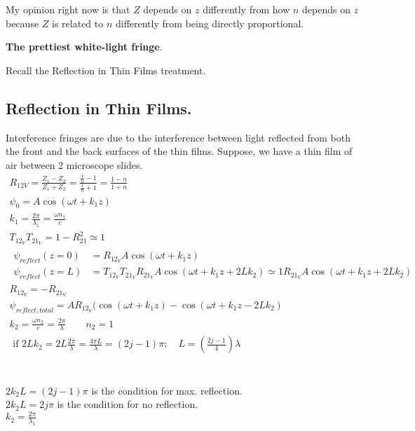 \documentclass[twoside,10pt]{amsart}
\newcommand{\problemhead}[1]
  {\smallskip
   \noindent{\large\bf Problem #1.}
   \smallskip}
\begin{document}
My opinion right now is that $Z$ depends on $z$ differently from how $n$ depends on $z$ because $Z$ is related to $n$ differently from being directly proportional.  

\problemhead{5.23} \textbf{ The prettiest white-light fringe}.  

Recall the Reflection in Thin Films treatment.  

\subsection*{ Reflection in Thin Films.}  

Interference fringes are due to the interference between light reflected from both the front and the back surfaces of the thin films.  Suppose, we have a thin film of air between 2 microscope slides.  
\[
\begin{gathered}
  R_{12V} = \frac{ Z_1 - Z_2}{ Z_1 + Z_2 } = \frac{ \frac{1}{n} - 1 }{ \frac{1}{n} + 1 } = \frac{ 1 - n }{ 1 + n } \\
  \psi_0 = A \cos{ (\omega t + k_1 z ) } \\
  k_1 = \frac{ 2 \pi }{ \lambda_1} = \frac{ \omega n_1 }{ c } \\
  T_{12_V} T_{21_V} = 1 - R_{21}^2 \simeq 1 \\
  \begin{aligned}
    \psi_{reflect}(z=0) & = R_{12_V} A \cos{ (\omega t + k_1 z) } \\ 
    \psi_{reflect}(z=L) & = T_{12_V} T_{21_V} R_{21_V} A \cos{ (\omega t + k_1 z + 2 Lk_2 ) } \simeq 1 R_{21_V} A \cos{( \omega t + k_1 z + 2 Lk_2 ) }
  \end{aligned} \\
  R_{12_V} = -R_{21_V} \\
  \psi_{reflect, total} = AR_{12_V} (\cos{ (\omega t + k_1 z )} - \cos{ (\omega t + k_1 z  - 2 Lk_2 ) } \\
  k_2 = \frac{ \omega n_2 }{ c } = \frac{ 2 \pi }{ \lambda } \quad \quad n_2 = 1 \\
 \boxed{ \text{ if } 2 Lk_2 = 2L \frac{ 2 \pi }{\lambda} = \frac{ 4 \pi L }{\lambda}  = (2j-1) \pi; \quad L = \left( \frac{ 2 j - 1 }{ 4 } \right) \lambda }
\end{gathered}
\]
\quad \\
\quad \\

$2k_2 L = (2j-1) \pi$ is the condition for max. reflection.  \\
$2k_2 L = 2j\pi$ is the condition for no reflection.  \\
$k_2 = \frac{ 2\pi }{ \lambda_1} $ 
\end{document}
